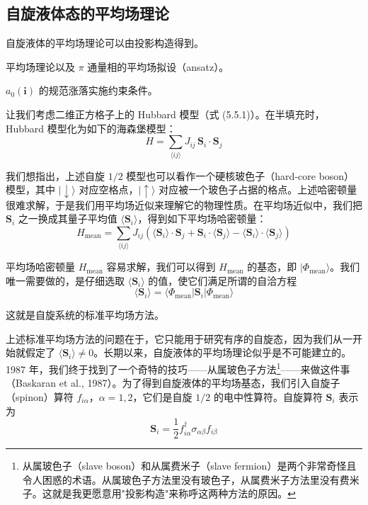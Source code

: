 \subsection{自旋液体态的平均场理论}

\begin{keypoints}
\item 自旋液体的平均场理论可以由投影构造得到。
\item 平均场理论以及 $\pi$ 通量相的平均场拟设（ansatz）。
\item $a_0(\pmb{i})$ 的规范涨落实施约束条件。
\end{keypoints}

让我们考虑二维正方格子上的 Hubbard 模型（式 (5.5.1)）。在半填充时，Hubbard 模型化为如下的海森堡模型：
\begin{equation*}
H=\sum_{\langle ij\rangle}J_{ij}\,\pmb{S}_i\cdot\pmb{S}_j
\tag{9.1.1}
\end{equation*}

我们想指出，上述自旋 $1/2$ 模型也可以看作一个硬核玻色子（hard-core boson）模型，其中 $|\downarrow\rangle$ 对应空格点，$|\uparrow\rangle$ 对应被一个玻色子占据的格点。上述哈密顿量很难求解，于是我们用平均场近似来理解它的物理性质。在平均场近似中，我们把 $\pmb{S}_i$ 之一换成其量子平均值 $\langle\pmb{S}_i\rangle$，得到如下平均场哈密顿量：
\begin{equation*}
H_{\text{mean}}=\sum_{\langle ij\rangle}J_{ij}\left(\langle\pmb{S}_i\rangle\cdot\pmb{S}_j+\pmb{S}_i\cdot\langle\pmb{S}_j\rangle-\langle\pmb{S}_i\rangle\cdot\langle\pmb{S}_j\rangle\right)
\end{equation*}

平均场哈密顿量 $H_{\text{mean}}$ 容易求解，我们可以得到 $H_{\text{mean}}$ 的基态，即 $|\Phi_{\text{mean}}\rangle$。我们唯一需要做的，是仔细选取 $\langle\pmb{S}_i\rangle$ 的值，使它们满足所谓的自洽方程
\begin{equation*}
\langle\pmb{S}_i\rangle=\langle\Phi_{\text{mean}}|\pmb{S}_i|\Phi_{\text{mean}}\rangle
\end{equation*}

这就是自旋系统的标准平均场方法。

上述标准平均场方法的问题在于，它只能用于研究有序的自旋态，因为我们从一开始就假定了 $\langle\pmb{S}_i\rangle\neq0$。长期以来，自旋液体的平均场理论似乎是不可能建立的。1987 年，我们终于找到了一个奇特的技巧——从属玻色子方法\footnote{从属玻色子（slave boson）和从属费米子（slave fermion）是两个非常奇怪且令人困惑的术语。从属玻色子方法里没有玻色子，从属费米子方法里没有费米子。这就是我更愿意用"投影构造"来称呼这两种方法的原因。}——来做这件事（Baskaran et al., 1987）。为了得到自旋液体的平均场基态，我们引入自旋子（spinon）算符 $f_{i\alpha}$，$\alpha=1,2$，它们是自旋 $1/2$ 的电中性算符。自旋算符 $\pmb{S}_i$ 表示为
\begin{equation*}
\pmb{S}_i=\frac{1}{2}f^{\dagger}_{i\alpha}\sigma_{\alpha\beta}f_{i\beta}
\tag{9.1.2}
\end{equation*}

